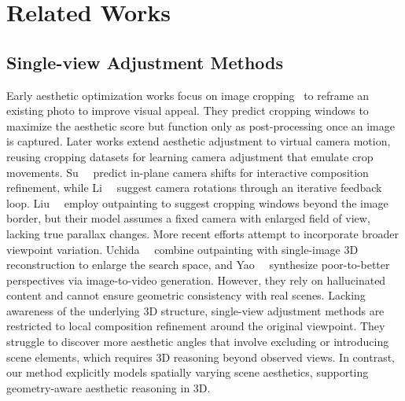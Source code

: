 \section{Related Works}
\label{sec:related}
\subsection{Single-view Adjustment Methods}
Early aesthetic optimization works focus on image cropping~\cite{wei2018good,zeng2019reliable,hong2021composing,wang2023image} to reframe an existing photo to improve visual appeal. They predict cropping windows to maximize the aesthetic score but function only as post-processing once an image is captured. Later works extend aesthetic adjustment to virtual camera motion, reusing cropping datasets for learning camera adjustment that emulate crop movements. Su~\etal~\cite{su2021camera} predict in-plane camera shifts for interactive composition refinement, while Li~\etal~\cite{li2025towards} suggest camera rotations through an iterative feedback loop. Liu~\etal~\cite{liu2023beyond} employ outpainting to suggest cropping windows beyond the image border, but their model assumes a fixed camera with enlarged field of view, lacking true parallax changes. More recent efforts attempt to incorporate broader viewpoint variation. Uchida~\etal~\cite{uchida20253d} combine outpainting with single-image 3D reconstruction to enlarge the search space, and Yao~\etal~\cite{yao2025photography} synthesize poor-to-better perspectives via image-to-video generation. However, they rely on hallucinated content and cannot ensure geometric consistency with real scenes.
Lacking awareness of the underlying 3D structure, single-view adjustment methods are restricted to local composition refinement around the original viewpoint. They struggle to discover more aesthetic angles that involve excluding or introducing scene elements, which requires 3D reasoning beyond observed views. In contrast, our method explicitly models spatially varying scene aesthetics, supporting geometry-aware aesthetic reasoning in 3D.

